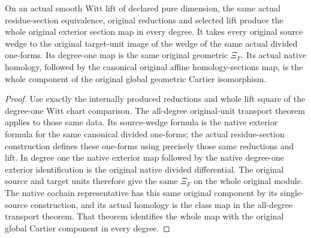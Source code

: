 \begin{corollary}
\label{cor:di-actual-witt-exterior-leading-cartier}
\leanok
On an actual smooth Witt lift of declared pure dimension, the same
actual residue-section equivalence, original reductions and selected
lift produce the whole original exterior section map in every degree.
It takes every original source wedge to the original target-unit image
of the wedge of the same actual divided one-forms. Its degree-one map
is the same original geometric $\Xi_F$. Its actual native homology,
followed by the canonical original affine homology-sections map, is the
whole component of the original global geometric Cartier isomorphism.
\end{corollary}
\begin{proof}
Use exactly the internally produced reductions and whole lift square
of the degree-one Witt chart comparison. The all-degree original-unit
transport theorem applies to those same data. Its source-wedge formula
is the native exterior formula for the same canonical divided
one-forms; the actual residue-section construction defines these
one-forms using precisely those same reductions and lift. In degree
one the native exterior map followed by the native degree-one exterior
identification is the original native divided differential. The
original source and target units therefore give the same $\Xi_F$ on
the whole original module. The native cochain representative has this
same original component by its single-source construction, and its
actual homology is the class map in the all-degree transport theorem.
That theorem identifies the whole map with the original global
Cartier component in every degree.
\end{proof}
